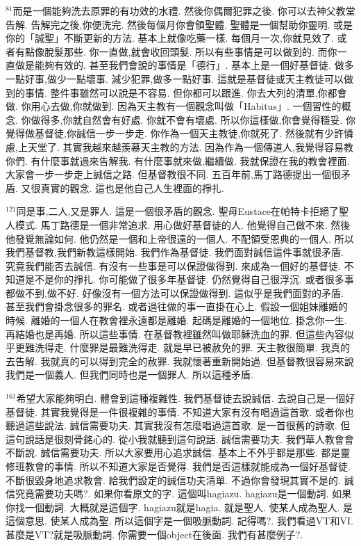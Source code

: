 \documentclass{book}
\begin{document}
$^{81}$而是一個能夠洗去原罪的有功效的水禮.
然後你偶爾犯罪之後.
你可以去神父教堂告解.
告解完之後,你便洗完.
然後每個月你會領聖體.
聖體是一個幫助你靈明.
或是你的「誠聖」不斷更新的方法.
基本上就像吃藥一樣.
每個月一次,你就見效了.
或者有點像脫髮那些.
你一直做,就會收回頭髮.
所以有些事情是可以做到的.
而你一直做是能夠有效的.
甚至我們會說的事情是「德行」.
基本上是一個好基督徒.
做多一點好事,做少一點壞事.
減少犯罪,做多一點好事.
這就是基督徒或天主教徒可以做到的事情.
整件事雖然可以說是不容易.
但你都可以跟進.
你去大列的清單,你都會做.
你用心去做,你就做到.
因為天主教有一個觀念叫做「Habitus」.
一個習性的概念.
你做得多,你就自然會有好處.
你就不會有壞處.
所以你這樣做,你會覺得穩妥.
你覺得做基督徒,你誠信一步一步走.
你作為一個天主教徒,你就死了.
然後就有少許憐慮,上天堂了.
其實我越來越羨慕天主教的方法.
因為作為一個傳道人,我覺得容易教你們.
有什麼事就過來告解我.
有什麼事就來做,繼續做.
我就保證在我的教會裡面.
大家會一步一步走上誠信之路.
但基督教很不同.
五百年前,馬丁路德提出一個很矛盾.
又很真實的觀念.
這也是他自己人生裡面的掙扎.

$^{121}$同是事,二人,又是罪人.
這是一個很矛盾的觀念.
聖母Eustace在帕特卡拒絕了聖人模式.
馬丁路德是一個非常追求.
用心做好基督徒的人.
他覺得自己做不來.
然後他發覺無論如何.
他仍然是一個和上帝很遠的一個人.
不配領受恩典的一個人.
所以我們基督教,我們新教這樣開始.
我們作為基督徒.
我們面對誠信這件事就很矛盾.
究竟我們能否去誠信.
有沒有一些事是可以保證做得到.
來成為一個好的基督徒.
不知道是不是你的掙扎.
你可能做了很多年基督徒.
仍然覺得自己很浮沉.
或者很多事都做不到,做不好.
好像沒有一個方法可以保證做得到.
這似乎是我們面對的矛盾.
甚至我們會掛念很多的罪名.
或者過往做的事一直掛在心上.
假設一個姐妹離婚的時候.
離婚的一個人在教會裡永遠都是離婚.
起碼是離婚的一個地位.
掛念你一生.
再結婚也是再婚.
所以這些事情.
在基督教裡雖然叫做耶穌洗血的罪.
但這些內容似乎更難洗得走.
什麼罪是最難洗得走.
就是早已被赦免的罪.
天主教很簡單.
我真的去告解.
我就真的可以得到完全的赦罪.
我就懷著重新開始過.
但基督教很容易來說我們是一個義人.
但我們同時也是一個罪人.
所以這種矛盾.

$^{161}$希望大家能夠明白.
體會到這種複雜性.
我們基督徒去說誠信.
去說自己是一個好基督徒.
其實我覺得是一件很複雜的事情.
不知道大家有沒有唱過這首歌.
或者你也聽過這些說法.
誠信需要功夫.
其實我沒有怎麼唱過這首歌.
是一首很舊的詩歌.
但這句說話是很刻骨銘心的.
從小我就聽到這句說話.
誠信需要功夫.
我們華人教會會不斷說.
誠信需要功夫.
所以大家要用心追求誠信.
基本上不外乎都是那些.
都是靈修班教會的事情.
所以不知道大家是否覺得.
我們是否這樣就能成為一個好基督徒.
不斷很毀身地追求教會.
給我們設定的誠信功夫清單.
不過你會發現其實不是的.
誠信究竟需要功夫嗎?.
如果你看原文的字.
這個叫hagiazu.
hagiazu是一個動詞.
如果你找一個動詞.
大概就是這個字.
hagiazu就是hagia.
就是聖人.
使某人成為聖人.
是這個意思.
使某人成為聖.
所以這個字是一個吸脈動詞.
記得嗎?.
我們看過VT和VI.
甚麼是VT?就是吸脈動詞.
你需要一個object在後面.
我們有甚麼例子?.
\end{document}
